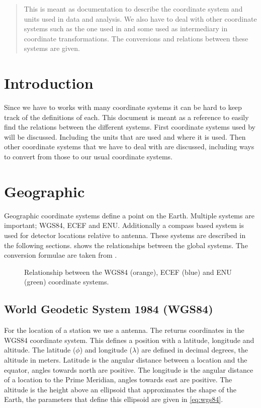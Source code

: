 \begin{abstract}

This is meant as documentation to describe the coordinate system and
units used in \hisparc data and analysis. We also have to deal with
other coordinate systems such as the one used in \corsika and some used
as intermediary in coordinate transformations. The conversions and
relations between these systems are given.

\end{abstract}


\section{Introduction}

Since we have to works with many coordinate systems it can be hard to
keep track of the definitions of each. This document is meant as a
reference to easily find the relations between the different systems.
First coordinate systems used by \hisparc will be discussed. Including
the units that are used and where it is used. Then other coordinate
systems that we have to deal with are discussed, including ways to
convert from those to our usual coordinate systems.


\section{Geographic}

Geographic coordinate systems define a point on the Earth. Multiple
systems are important; WGS84, ECEF and ENU. Additionally a compass based
system is used for detector locations relative to \gps antenna. These
systems are described in the following sections.
 shows the relationships between the global
systems. The conversion formulae are taken from \cite{wikipedia:2014aa}.

\begin{figure}
    \centering
    
    \caption{Relationship between the WGS84 (orange), ECEF (blue) and ENU
             (green) coordinate systems.}
    \label{fig:wgs84_ecef_enu}
\end{figure}


\subsection{World Geodetic System 1984 (WGS84)}

For the location of a station we use a \gps antenna. The \gps returns
coordinates in the WGS84 coordinate system. This defines a position with
a latitude, longitude and altitude. The latitude ($\phi$) and longitude
($\lambda$) are defined in decimal degrees, the altitude in meters.
Latitude is the angular distance between a location and the equator,
angles towards north are positive. The longitude is the angular distance
of a location to the Prime Meridian, angles towards east are positive.
The altitude is the height above an ellipsoid that approximates the
shape of the Earth, the parameters that define this ellipsoid are given
in \eqref{eq:wgs84}.


